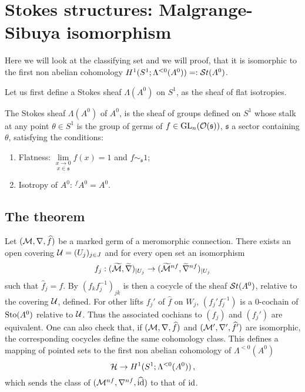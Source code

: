 \section{Stokes structures: Malgrange-Sibuya isomorphism}
\begin{comment}
  \cite[Thm.I.2.1]{Loday1994}, \cite[Thm.4.3.9]{Loday2014} and
  \cite[Thm.II.6.2]{sabbah2007isomonodromic}
\end{comment}
Here we will look at the classifying set and we will proof, that it is
isomorphic \TODO[as\dots] to the first non abelian cohomology 
$H^1(S^1;\Lambda^{<0}(A^0))=:\mathcal{S}{}t(A^0)$.

Let us first define a Stokes sheaf $\Lambda(A^0)$ on $S^1$, as the sheaf of
flat isotropies.
\begin{defn} \label{defn:StokesSheaf}
  The Stokes sheaf $\Lambda(A^0)$ of $A^0$, is the sheaf of groups defined on
  $S^1$ whose stalk at any point $\theta\in S^1$ is the group of germs of
  $f\in\operatorname{GL}_n(\mathcal{O}(\mathfrak{s}))$, $\mathfrak{s}$ a sector containing $\theta$, satisfying
  the conditions:
  \begin{enumerate}
    \item Flatness: $\underset{x\in\mathfrak{s}}{\underset{x\to0}{\lim}}f(x)=1$
      and $f\sim_{\mathfrak{s}} 1$;
    \item Isotropy of $A^0$: ${}^f\!A^0=A^0$.
  \end{enumerate}
  \begin{comment}
    \begin{s-rem}
      $\Lambda(A^0)$ is the same as $\Aut^{<0}(\tilde\cM^{nf})$
      in~\cite{sabbah2007isomonodromic} which is defined as follows \TODO
    \end{s-rem}
  \end{comment}
\end{defn}

\subsection{The theorem}
\begin{comment}
  \TODO[See \cite{thboalch} for sheaf-less definition]
\end{comment}
Let $(\mathcal{M},\nabla,\widehat f)$ be a marked germ of a  meromorphic connection.
There exists an open covering $\mathcal{U}=(U_j)_{j\in J}$ and for every open set an
isomorphism
\[
  f_j:(\widetilde{\mathcal{M}},\widetilde\nabla)_{|U_j}
  \to(\widetilde{\mathcal{M}}^{nf},\widetilde\nabla^{nf})_{|U_j}
\]
such that $\hat f_j=f$. By $(f_kf_j^{-1})_{jk}$ is then a cocycle of the
sheaf $\mathcal{S}{}t(A^0)$, relative to the covering $\mathcal{U}$, defined.
For other lifts $f_j'$ of $\hat f$ on $W_j$, $(f_j'f_j^{-1})$ is a $0$-cochain
of $\operatorname{Sto}(A^0)$ relative to $\mathcal{U}$. Thus the associated cochians to $(f_j)$ and
$(f_j')$ are equivalent. One can also check that, if $(\mathcal{M},\nabla,\widehat f)$ and
$(\mathcal{M}',\nabla',\widehat f')$ are isomorphic, the corresponding cocycles define the
same cohomology class. This defines a mapping of pointed sets
to the first non abelian cohomology of $\Lambda^{<0}(A^0)$
\[
  \mathcal{H}\to H^1(S^1;\Lambda^{<0}(A^0)) \,,
\]
which sends the class of $(\mathcal{M}^{nf},\nabla^{nf},\widehat{\operatorname{id}})$ to that of
$\operatorname{id}$.

